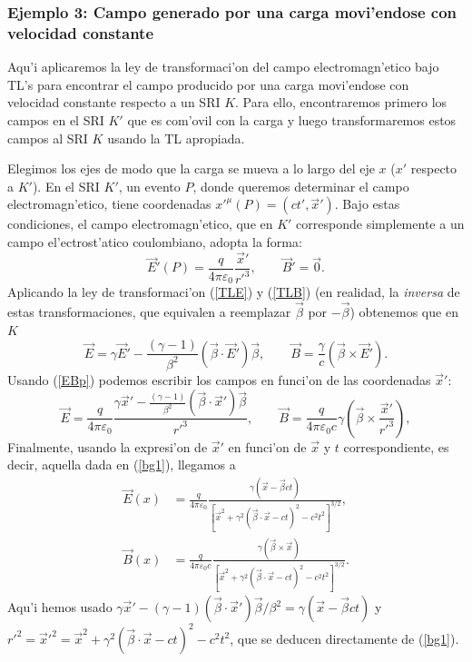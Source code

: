 \subsubsection{Ejemplo 3: Campo generado por una carga movi'endose con velocidad constante}\label{secEjEBvc}
Aqu'i aplicaremos la ley de transformaci'on del campo electromagn'etico bajo
TL's para encontrar el campo producido por una carga movi'endose con velocidad constante respecto a un SRI $K$. Para ello, encontraremos primero los campos en el SRI $K'$ que es com'ovil con la carga y luego transformaremos estos campos al SRI $K$ usando la TL apropiada.

Elegimos los ejes de modo que la carga se mueva a lo largo del eje $x$ ($x'$ respecto a $K'$). En el SRI $K'$, un evento $P$, donde queremos determinar el campo electromagn'etico, tiene coordenadas $x'^\mu(P)=(ct',\vec{x}')$. Bajo estas condiciones, el campo electromagn'etico, que en $K'$ corresponde simplemente a un campo el'ectrost'atico coulombiano, adopta la forma:
\begin{equation}
\vec{E}'(P)=\frac{q}{4\pi\varepsilon_0}\frac{\vec{x}'}{r'^3}, \qquad \vec{B}' =\vec{0}. \label{EBp}
\end{equation}
Aplicando la ley de transformaci'on (\ref{TLE}) y (\ref{TLB}) (en realidad, la
\textit{inversa} de estas transformaciones, que equivalen a reemplazar
$\vec{\beta}$ por $-\vec{\beta}$) obtenemos que en $K$
\begin{equation}
\vec{E}=\gamma \vec{E}'-\frac{(\gamma -1)}{\beta^2}\left( \vec{\beta}\cdot
\vec{E}'\right) \vec{\beta} , \qquad
\vec{B}=\frac{\gamma}{c} \left(\vec{\beta}\times\vec{E}'\right).
\end{equation}
Usando (\ref{EBp}) podemos escribir los campos en funci'on de las coordenadas
$\vec{x}'$:
\begin{equation}
\vec{E}=\frac{q}{4\pi\varepsilon_0}\frac{\gamma \vec{x}'-\frac{(\gamma -1)}{\beta^2}(\vec{\beta}\cdot
\vec{x}')\vec{\beta}}{r'^3}  , \qquad
\vec{B}=\frac{q}{4\pi\varepsilon_0 c}\gamma \left(\vec{\beta}\times\frac{\vec{x}'}{r'^3}\right),
\end{equation}
Finalmente, usando la expresi'on de $\vec{x}'$ en funci'on de $\vec{x}$ y $t$
correspondiente, es decir, aquella dada en (\ref{bg1}), llegamos a
\begin{align}
\vec{E}(x) &= \frac{q}{4\pi\varepsilon_0}\frac{\gamma\left( \vec{x}-\vec{\beta}ct\right)}
{\left[\vec{x}^2+\gamma^2\left(\vec{\beta}\cdot\vec{x}-ct\right)^2-c^2t^2\right]^{3/2}} , \\
\vec{B}(x) &= \frac{q}{4\pi\varepsilon_0c}\frac{\gamma\left( \vec{\beta}\times\vec{x}\right) }
{\left[\vec{x}^2+\gamma^2\left(\vec{\beta}\cdot\vec{x}-ct\right)^2-c^2t^2\right]^{3/2}}.
\end{align}
Aqu'i hemos usado $\gamma \vec{x}'-(\gamma -1)(\vec{\beta}\cdot\vec{x}')\vec{\beta}/\beta^2=\gamma\left( \vec{x}-\vec{\beta}ct\right) $ y
$r'^2=\vec{x}'^2=\vec{x}^2+\gamma^2\left(\vec{\beta}\cdot\vec{x}-ct\right)^2-c^2t^2$, que se deducen directamente de (\ref{bg1}).

